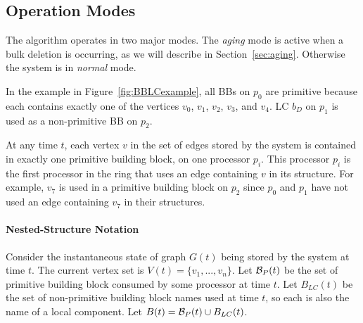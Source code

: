 
\subsection{Operation Modes}

The \XSCC algorithm operates in two major modes. The \emph{aging} mode is active when a bulk deletion is occurring, as we will describe in Section~\ref{sec:aging}.  Otherwise the system is in \emph{normal} mode.


\iffalse
In the example in Figure~\ref{fig:BBLCexample}, all BBs on $p_0$ are primitive because each contains exactly one of the vertices $v_0$, $v_1$, $v_2$, $v_3$, and $v_4$. LC $b_D$ on $p_1$ is used as a non-primitive BB on $p_2$. 



At any time $t$, each vertex $v$ in the set of edges stored by the system is contained in exactly one primitive building block, on one processor $p_i$. This processor $p_i$ is the first processor in the ring that uses an edge containing $v$ in its \uf structure. For example, $v_7$ is used in a primitive building block on $p_2$ since $p_0$ and $p_1$ have not used an edge containing $v_7$ in their \uf structures. 


\paragraph{Nested-Structure Notation}
Consider the instantaneous state of graph $G(t)$ being stored by the system at time $t$. The current vertex set is $V(t) = \{v_1,...,v_n\}$. Let ${\cal B}_P(t)$ be the set of primitive building block consumed by some processor at time $t$.  Let $B_{LC}(t)$ be the set of non-primitive building block names used at time $t$, so each is also the name of a local component. Let $B(t) = {\cal B}_P(t) \cup B_{LC}(t) $. %


